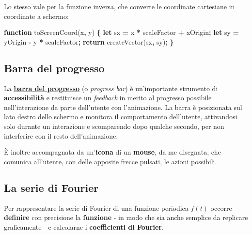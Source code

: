 \documentclass[
]{book}
\newenvironment{Shaded}{\begin{snugshade}}{\end{snugshade}}
\newcommand{\AttributeTok}[1]{\textcolor[rgb]{0.77,0.63,0.00}{#1}}
\newcommand{\ControlFlowTok}[1]{\textcolor[rgb]{0.13,0.29,0.53}{\textbf{#1}}}
\newcommand{\KeywordTok}[1]{\textcolor[rgb]{0.13,0.29,0.53}{\textbf{#1}}}
\newcommand{\NormalTok}[1]{#1}
\newcommand{\OperatorTok}[1]{\textcolor[rgb]{0.81,0.36,0.00}{\textbf{#1}}}
\begin{document}
Lo stesso vale per la funzione inversa, che converte le coordinate cartesiane in coordinate a schermo:

\begin{Shaded}
\begin{Highlighting}[]
\KeywordTok{function} \AttributeTok{toScreenCoord}\NormalTok{(x}\OperatorTok{,}\NormalTok{ y) }\OperatorTok{\{}
    \KeywordTok{let}\NormalTok{ sx }\OperatorTok{=}\NormalTok{ x }\OperatorTok{*}\NormalTok{ scaleFactor }\OperatorTok{+}\NormalTok{ xOrigin}\OperatorTok{;}
    \KeywordTok{let}\NormalTok{ sy }\OperatorTok{=}\NormalTok{ yOrigin }\OperatorTok{-}\NormalTok{ y }\OperatorTok{*}\NormalTok{ scaleFactor}\OperatorTok{;}
    \ControlFlowTok{return} \AttributeTok{createVector}\NormalTok{(sx}\OperatorTok{,}\NormalTok{ sy)}\OperatorTok{;}
\OperatorTok{\}}
\end{Highlighting}
\end{Shaded}

\hypertarget{progrbar}{%
\subsection{Barra del progresso}\label{progrbar}}

La \href{https://github.com/Bradwave/thesis/blob/master/animations/js/utils/progressGraphics.js}{\textbf{barra del progresso}} (o \emph{progress bar}) è un'importante strumento di \textbf{accessibilità} e restituisce un \emph{feedback} in merito al progresso possibile nell'interazione da parte dell'utente con l'animazione. La barra è posizionata sul lato destro dello schermo e monitora il comportamento dell'utente, attivandosi solo durante un interazione e scomparendo dopo qualche secondo, per non interferire con il resto dell'animazione.

È inoltre accompagnata da un'\textbf{icona} di un \textbf{mouse}, da me disegnata, che comunica all'utente, con delle apposite frecce pulsati, le azioni possibili.

\hypertarget{anserie}{%
\subsection{La serie di Fourier}\label{anserie}}

Per rappresentare la serie di Fourier di una funzione periodica \(f(t)\) occorre \textbf{definire} con precisione la \textbf{funzione} - in modo che sia anche semplice da replicare graficamente - e calcolarne i \textbf{coefficienti di Fourier}.
\end{document}
